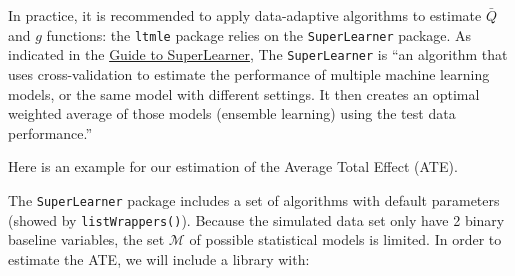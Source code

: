 \documentclass[
]{book}
\newenvironment{Shaded}{\begin{snugshade}}{\end{snugshade}}
\newcommand{\CommentTok}[1]{\textcolor[rgb]{0.56,0.35,0.01}{\textit{#1}}}
\newcommand{\FunctionTok}[1]{\textcolor[rgb]{0.13,0.29,0.53}{\textbf{#1}}}
\newcommand{\NormalTok}[1]{#1}
\newcommand{\SpecialCharTok}[1]{\textcolor[rgb]{0.81,0.36,0.00}{\textbf{#1}}}
\begin{document}
\begin{Shaded}
\end{Shaded}

In practice, it is recommended to apply data-adaptive algorithms to estimate \(\bar{Q}\) and \(g\) functions: the \texttt{ltmle} package relies on the \texttt{SuperLearner} package. As indicated in the \href{https://cran.r-project.org/web/packages/SuperLearner/vignettes/Guide-to-SuperLearner.html}{Guide to SuperLearner},
The \texttt{SuperLearner} is ``an algorithm that uses cross-validation to estimate the performance of multiple machine learning models, or the same model with different settings. It then creates an optimal weighted average of those models (ensemble learning) using the test data performance.''

Here is an example for our estimation of the Average Total Effect (ATE).

The \texttt{SuperLearner} package includes a set of algorithms with default parameters (showed by \texttt{listWrappers()}). Because the simulated data set only have 2 binary baseline variables, the set \(\mathcal{M}\) of possible statistical models is limited. In order to estimate the ATE, we will include a library with:
\end{document}
